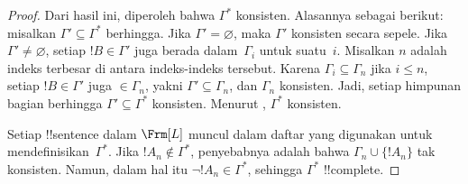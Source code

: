\documentclass[../../../include/open-logic-section]{subfiles}
\begin{document}
\begin{proof}
Dari hasil ini, diperoleh bahwa $\Gamma^*$ konsisten. Alasannya sebagai
berikut: misalkan $\Gamma' \subseteq \Gamma^*$ berhingga. Jika
$\Gamma'=\varnothing$, maka $\Gamma'$ konsisten secara sepele. Jika
$\Gamma'\ne\varnothing$, setiap $!B \in \Gamma'$ juga berada
dalam~$\Gamma_i$ untuk suatu~$i$. Misalkan $n$ adalah indeks terbesar di
antara indeks-indeks tersebut. Karena $\Gamma_i \subseteq \Gamma_n$ jika
$i \le n$, setiap $!B \in \Gamma'$ juga $\in \Gamma_n$, yakni $\Gamma'
\subseteq \Gamma_n$, dan $\Gamma_n$ konsisten. Jadi, setiap himpunan
bagian berhingga $\Gamma' \subseteq \Gamma^*$ konsisten.
Menurut , $\Gamma^*$ konsisten.

Setiap !!{sentence} dalam $\Frm[L]$ muncul dalam daftar yang digunakan
untuk mendefinisikan~$\Gamma^*$. Jika $!A_n \notin \Gamma^*$, penyebabnya
adalah bahwa $\Gamma_n \cup \{!A_n\}$ tak konsisten. Namun, dalam hal
itu $\lnot !A_n \in \Gamma^*$, sehingga $\Gamma^*$ !!{complete}.
\end{proof}
\end{document}
